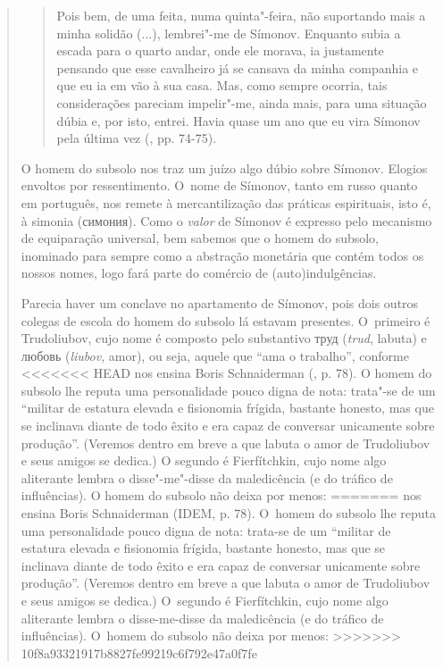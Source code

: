 {\begin{quote}
\begin{quote}
Pois bem, de uma feita, numa quinta"-feira, não suportando mais a minha
solidão (...), lembrei"-me de Símonov. Enquanto subia a escada para o
quarto andar, onde ele morava, ia justamente pensando que esse
cavalheiro já se cansava da minha companhia e que eu ia em vão à sua
casa. Mas, como sempre ocorria, tais considerações pareciam impelir"-me,
ainda mais, para uma situação dúbia e, por isto, entrei. Havia quase um
ano que eu vira Símonov pela última vez (, pp. 74-75).
\end{quote}

O homem do subsolo nos traz um juízo algo dúbio sobre Símonov. Elogios
envoltos por ressentimento. O~nome de Símonov, tanto em russo quanto em
português, nos remete à mercantilização das práticas espirituais, isto
é, à simonia
(симония). Como o
\emph{valor} de Símonov é expresso pelo mecanismo de equiparação
universal, bem sabemos que o homem do subsolo, inominado para sempre
como a abstração monetária que contém todos os nossos nomes, logo fará
parte do comércio de (auto)indulgências.

Parecia haver um conclave no apartamento de Símonov, pois dois outros
colegas de escola do homem do subsolo lá estavam presentes. O~primeiro é
Trudoliubov, cujo nome é composto pelo substantivo
труд (\emph{trud},
labuta) e любовь
(\emph{liubov}, amor), ou seja, aquele que ``ama o trabalho'', conforme
<<<<<<< HEAD
nos ensina Boris Schnaiderman (, p. 78). O homem do subsolo lhe
reputa uma personalidade pouco digna de nota: trata"-se de um ``militar
de estatura elevada e fisionomia frígida, bastante honesto, mas que se
inclinava diante de todo êxito e era capaz de conversar unicamente sobre
produção''. (Veremos dentro em breve a que labuta o amor de Trudoliubov
e seus amigos se dedica.) O segundo é Fierfítchkin, cujo nome algo
aliterante lembra o disse"-me"-disse da maledicência (e do tráfico de
influências). O homem do subsolo não deixa por menos:
=======
nos ensina Boris Schnaiderman (IDEM, p. 78). O~homem do subsolo lhe
reputa uma personalidade pouco digna de nota: trata-se de um ``militar
de estatura elevada e fisionomia frígida, bastante honesto, mas que se
inclinava diante de todo êxito e era capaz de conversar unicamente sobre
produção''. (Veremos dentro em breve a que labuta o amor de Trudoliubov
e seus amigos se dedica.) O~segundo é Fierfítchkin, cujo nome algo
aliterante lembra o disse-me-disse da maledicência (e do tráfico de
influências). O~homem do subsolo não deixa por menos:
>>>>>>> 10f8a93321917b8827fe99219c6f792e47a0f7fe


\end{quote}}
